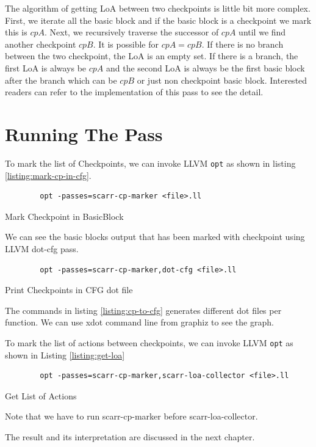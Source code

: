 The algorithm of getting LoA between two checkpoints is little bit more complex.
First, we iterate all the basic block and if the basic block is a checkpoint we
mark this is $cpA$. Next, we recursively traverse the successor of $cpA$ until
we find another checkpoint $cpB$. It is possible for $cpA = cpB$. If there is no
branch between the two checkpoint, the LoA is an empty set. If there is a
branch, the first LoA is always be $cpA$ and the second LoA is always be the
first basic block after the branch \textemdash{} which can be $cpB$ or just non
checkpoint basic block. Interested readers can refer to the implementation of
this pass to see the detail.

\section{Running The Pass}

To mark the list of Checkpoints, we can invoke LLVM \texttt{opt} as shown in
listing \ref{listing:mark-cp-in-cfg}.

\begin{listing}[htbp]
    \begin{verbatim}
        opt -passes=scarr-cp-marker <file>.ll
    \end{verbatim}
    \caption{Mark Checkpoint in BasicBlock}    
    \label{listing:mark-cp-in-cfg}
\end{listing}

We can see the basic blocks output that has been marked with checkpoint using
LLVM dot-cfg pass.

\begin{listing}[htbp]
    \begin{verbatim}
        opt -passes=scarr-cp-marker,dot-cfg <file>.ll
    \end{verbatim}
    \caption{Print Checkpoints in CFG dot file}    
    \label{listing:cp-to-cfg}
\end{listing}

The commands in listing \ref{listing:cp-to-cfg} generates different dot files
per function. We can use xdot command line from graphiz to see the graph. 

To mark the list of actions between checkpoints, we can invoke LLVM \texttt{opt}
as shown in Listing \ref{listing:get-loa}

\begin{listing}
    \begin{verbatim}
        opt -passes=scarr-cp-marker,scarr-loa-collector <file>.ll
    \end{verbatim}
    \caption{Get List of Actions}    
    \label{listing:get-loa}
\end{listing}

Note that we have to run scarr-cp-marker before scarr-loa-collector.

The result and its interpretation are discussed in the next chapter.